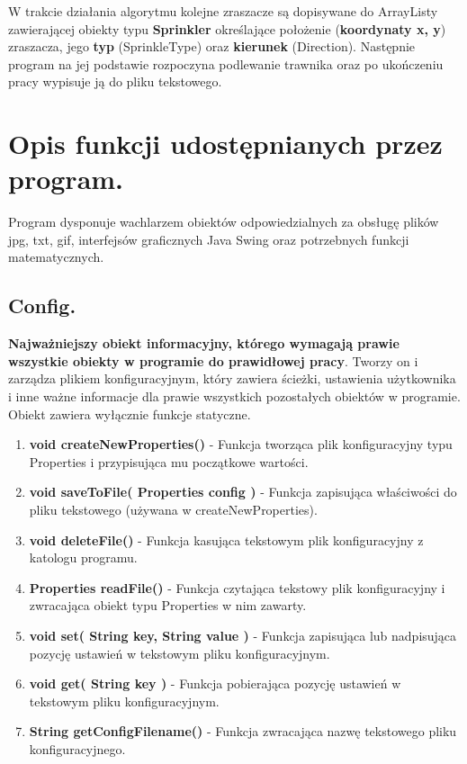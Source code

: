 \documentclass[a4paper]{article}
\begin{document}
W trakcie działania algorytmu kolejne zraszacze są dopisywane do ArrayListy zawierającej obiekty typu \textbf{Sprinkler} określające położenie (\textbf{koordynaty x, y}) zraszacza, jego \textbf{typ} (SprinkleType) oraz \textbf{kierunek} (Direction). Następnie program na jej podstawie rozpoczyna podlewanie trawnika oraz po ukończeniu pracy wypisuje ją do pliku tekstowego.

\newpage
\section{Opis funkcji udostępnianych przez program.}
Program dysponuje wachlarzem obiektów odpowiedzialnych za obsługę plików jpg, txt, gif, interfejsów graficznych Java Swing oraz potrzebnych funkcji matematycznych. 

\subsection{Config.}
\textbf{Najważniejszy obiekt informacyjny, którego wymagają prawie wszystkie obiekty w programie do prawidłowej pracy}. Tworzy on i zarządza plikiem konfiguracyjnym, który zawiera ścieżki, ustawienia użytkownika i inne ważne informacje dla prawie wszystkich pozostałych obiektów w programie. Obiekt zawiera wyłącznie funkcje statyczne.
\begin{enumerate}
    	\item \textbf{void createNewProperties()} - Funkcja tworząca plik konfiguracyjny typu Properties i przypisująca mu początkowe wartości.
    	\item \textbf{void saveToFile( Properties config )} - Funkcja zapisująca właściwości do pliku tekstowego (używana w createNewProperties).
    	\item \textbf{void deleteFile()} - Funkcja kasująca tekstowym plik konfiguracyjny z katologu programu.
    	\item \textbf{Properties readFile()} - Funkcja czytająca tekstowy plik konfiguracyjny i zwracająca obiekt typu Properties w nim zawarty.
    	\item \textbf{void set( String key, String value )} - Funkcja zapisująca lub nadpisująca pozycję ustawień w tekstowym pliku konfiguracyjnym.
    	\item \textbf{void get( String key )} - Funkcja pobierająca pozycję ustawień w tekstowym pliku konfiguracyjnym.
	\item \textbf{String getConfigFilename()} - Funkcja zwracająca nazwę tekstowego pliku konfiguracyjnego.
\end{enumerate}
\end{document}

